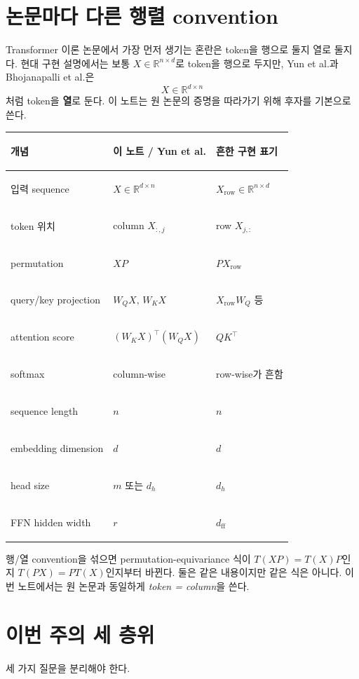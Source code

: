 \documentclass[11pt,a4paper,oneside,openany]{memoir}
\newcommand{\R}{\mathbb{R}}
\theoremstyle{definition}
\begin{document}
\section{논문마다 다른 행렬 convention}

Transformer 이론 논문에서 가장 먼저 생기는 혼란은 token을 행으로 둘지 열로 둘지다.
현대 구현 설명에서는 보통 $X\in\R^{n\times d}$로 token을 행으로 두지만,
Yun et al.과 Bhojanapalli et al.은
\[
X\in\R^{d\times n}
\]
처럼 token을 \textbf{열}로 둔다. 이 노트는 원 논문의 증명을 따라가기 위해 후자를 기본으로 쓴다.

\begin{center}
\small
\begin{tabularx}{\textwidth}{>{\bfseries\raggedright\arraybackslash}p{}Y Y}
\toprule
개념 & 이 노트 / Yun et al. & 흔한 구현 표기 \\
\midrule
입력 sequence & $X\in\R^{d\times n}$ & $X_{\mathrm{row}}\in\R^{n\times d}$ \\
token 위치 & column $X_{:,j}$ & row $X_{j,:}$ \\
permutation & $XP$ & $PX_{\mathrm{row}}$ \\
query/key projection & $W_QX,\,W_KX$ & $X_{\mathrm{row}}W_Q$ 등 \\
attention score & $(W_KX)^\top(W_QX)$ & $QK^\top$ \\
softmax & column-wise & row-wise가 흔함 \\
sequence length & $n$ & $n$ \\
embedding dimension & $d$ & $d$ \\
head size & $m$ 또는 $d_h$ & $d_h$ \\
FFN hidden width & $r$ & $d_{\mathrm{ff}}$ \\
\bottomrule
\end{tabularx}
\end{center}

\begin{warningbox}
행/열 convention을 섞으면 permutation-equivariance 식이 $T(XP)=T(X)P$인지
$T(PX)=PT(X)$인지부터 바뀐다. 둘은 같은 내용이지만 같은 식은 아니다.
이번 노트에서는 원 논문과 동일하게 \emph{token = column}을 쓴다.
\end{warningbox}

\section{이번 주의 세 층위}

세 가지 질문을 분리해야 한다.
\end{document}
